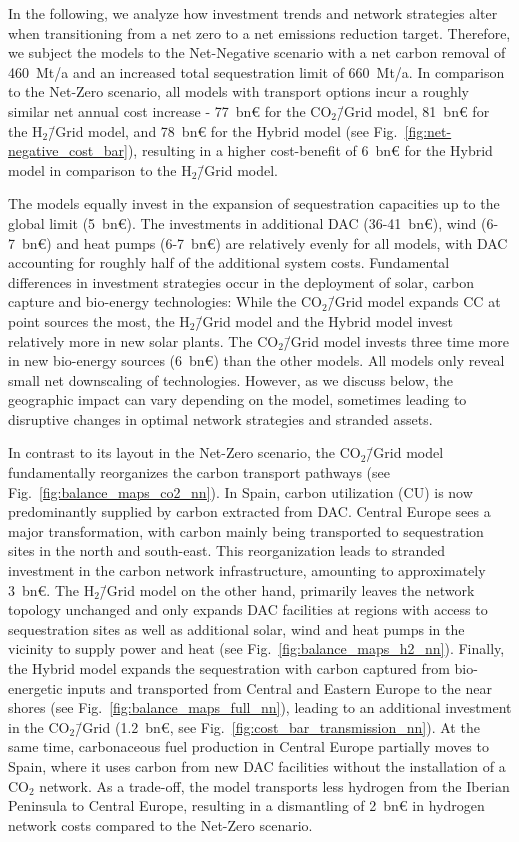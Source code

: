 \documentclass[twocolumn]{article}
\newcommand{\COtwo}{CO$_2$}
\newcommand{\modCO}{CO$_2$\=/Grid model}
\newcommand{\modH}{H$_2$\=/Grid model}
\newcommand{\modHybrid}{Hybrid model}
\newcommand{\carbongrid}{CO$_2$\=/Grid}
\newcommand{\carbonmodel}{CO$_2$\=/Grid model}
\newcommand{\hydrogenmodel}{H$_2$\=/Grid model}
\newcommand{\hybridmodel}{Hybrid model}
\begin{document}
In the following, we analyze how investment trends and network strategies alter when transitioning from a net zero to a net emissions reduction target. Therefore, we subject the models to the Net-Negative scenario with a net carbon removal of 460~Mt/a and an increased total sequestration limit of 660~Mt/a. In comparison to the Net-Zero scenario, all models with transport options incur a roughly similar net annual cost increase - 77~bn€ for the \modCO{}, 81~bn€ for the \modH{}, and 78~bn€ for the \modHybrid{} (see Fig.~\ref{fig:net-negative_cost_bar}), resulting in a higher cost-benefit of 6~bn€ for the \hybridmodel{} in comparison to the \hydrogenmodel{}.

The models equally invest in the expansion of sequestration capacities up to the global limit (5~bn€). The investments in additional DAC (36-41~bn€), wind (6-7~bn€) and heat pumps (6-7~bn€) are relatively evenly for all models, with DAC accounting for roughly half of the additional system costs.
Fundamental differences in investment strategies occur in the deployment of solar, carbon capture and bio-energy technologies: While the \carbonmodel{} expands CC at point sources the most, the \hydrogenmodel{} and the \hybridmodel{} invest relatively more in new solar plants. The \carbonmodel{} invests three time more in new bio-energy sources (6~bn€) than the other models.
All models only reveal small net downscaling of technologies. However, as we discuss below, the geographic impact can vary depending on the model, sometimes leading to disruptive changes in optimal network strategies and stranded assets.


In contrast to its layout in the Net-Zero scenario, the \carbonmodel{} fundamentally reorganizes the carbon transport pathways (see Fig.~\ref{fig:balance_maps_co2_nn}).
In Spain, carbon utilization (CU) is now predominantly supplied by carbon extracted from DAC. Central Europe sees a major transformation, with carbon mainly being transported to sequestration sites in the north and south-east. This reorganization leads to stranded investment in the carbon network infrastructure, amounting to approximately 3~bn€.
%
The \modH{} on the other hand, primarily leaves the network topology unchanged and only expands DAC facilities at regions with access to sequestration sites as well as additional solar, wind and heat pumps in the vicinity to supply power and heat (see Fig.~\ref{fig:balance_maps_h2_nn}).
%
Finally, the \modHybrid{} expands the sequestration with carbon captured from bio-energetic inputs and transported from Central and Eastern Europe to the near shores (see Fig.~\ref{fig:balance_maps_full_nn}), leading to an additional investment in the \carbongrid{} (1.2~bn€, see Fig.~\ref{fig:cost_bar_transmission_nn}). At the same time, carbonaceous fuel production in Central Europe partially moves to Spain, where it uses carbon from new DAC facilities without the installation of a \COtwo{} network. As a trade-off, the model transports less hydrogen from the Iberian Peninsula to Central Europe, resulting in a dismantling of 2~bn€ in hydrogen network costs compared to the Net-Zero scenario.
\end{document}
